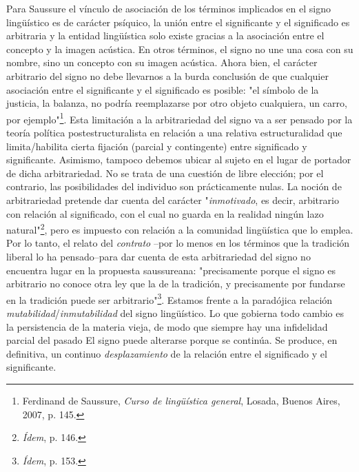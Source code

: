\documentclass{book}
\begin{document}
Para Saussure el vínculo de asociación de los términos implicados en el
signo lingüístico es de carácter psíquico, la unión entre el
significante y el significado es arbitraria y la entidad lingüística
solo existe gracias a la asociación entre el concepto y la imagen
acústica. En otros términos, el signo no une una cosa con su nombre,
sino un concepto con su imagen acústica. Ahora bien, el carácter
arbitrario del signo no debe llevarnos a la burda conclusión de que
cualquier asociación entre el significante y el significado es posible:
"el símbolo de la justicia, la balanza, no podría reemplazarse por otro
objeto cualquiera, un carro, por ejemplo"\footnote{Ferdinand de
  Saussure, \emph{Curso de lingüística general}, Losada, Buenos Aires,
  2007, p. 145.}. Esta limitación a la arbitrariedad del signo va a ser
pensado por la teoría política postestructuralista en relación a una
relativa estructuralidad que limita/habilita cierta fijación (parcial y
contingente) entre significado y significante. Asimismo, tampoco debemos
ubicar al sujeto en el lugar de portador de dicha arbitrariedad. No se
trata de una cuestión de libre elección; por el contrario, las
posibilidades del individuo son prácticamente nulas. La noción de
arbitrariedad pretende dar cuenta del carácter "\emph{inmotivado}, es
decir, arbitrario con relación al significado, con el cual no guarda en
la realidad ningún lazo natural"\footnote{\emph{Ídem}, p. 146.}, pero es
impuesto con relación a la comunidad lingüística que lo emplea. Por lo
tanto, el relato del \emph{contrato} --por lo menos en los términos que
la tradición liberal lo ha pensado--para dar cuenta de esta
arbitrariedad del signo no encuentra lugar en la propuesta saussureana:
"precisamente porque el signo es arbitrario no conoce otra ley que la de
la tradición, y precisamente por fundarse en la tradición puede ser
arbitrario"\footnote{\emph{Ídem}, p. 153.}. Estamos frente a la
paradójica relación \emph{mutabilidad}/\emph{inmutabilidad} del signo
lingüístico. Lo que gobierna todo cambio es la persistencia de la
materia vieja, de modo que siempre hay una infidelidad parcial del
pasado El signo puede alterarse porque se continúa. Se produce, en
definitiva, un continuo \emph{desplazamiento} de la relación entre el
significado y el significante.
\end{document}
